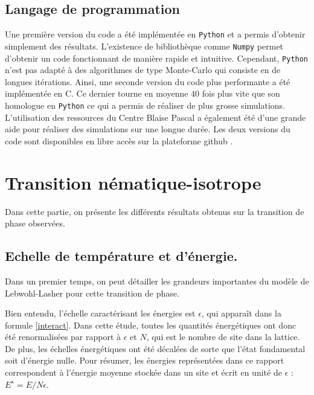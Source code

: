 \documentclass[11pt,a4paper]{article}
\numberwithin{equation}{section}
\newcommand{\CC}{C\nolinebreak\hspace{-.05em}\raisebox{.4ex}{\tiny\bf +}\nolinebreak\hspace{-.10em}\raisebox{.4ex}{\tiny\bf +}}
\def\CC{{C\nolinebreak[4]\hspace{-.05em}\raisebox{.4ex}{\tiny\bf ++}}}
\begin{document}
\subsection{Langage de programmation}
Une première version du code a été implémentée en \texttt{Python} et a permis d'obtenir simplement des résultats. L'existence de bibliothèque comme \texttt{Numpy} permet d'obtenir un code fonctionnant de manière rapide et intuitive. Cependant, \texttt{Python} n'est pas adapté à des algorithmes de type Monte-Carlo qui consiste en de longues itérations. Ainsi, une seconde version du code plus performante a été implémentée en \CC. Ce dernier tourne en moyenne 40 fois plus vite que son homologue en \texttt{Python} ce qui a permis de réaliser de plus grosse simulations. L'utilisation des ressources du Centre Blaise Pascal a également été d'une grande aide pour réaliser des simulations sur une longue durée. Les deux versions du code sont disponibles en libre accès sur la plateforme github \cite{github}.
\newpage
\section{Transition nématique-isotrope}
Dans cette partie, on présente les différents résultats obtenus sur la transition de phase observées. 
\subsection{Echelle de température et d'énergie.}
\label{scale}
Dans un premier temps, on peut détailler les grandeurs importantes du modèle de Lebwohl-Lasher pour cette transition de phase.
\medskip

Bien entendu, l'échelle caractérisant les énergies est $\epsilon$, qui apparaît dans la formule \ref{interact}. Dans cette étude, toutes les quantités énergétiques ont donc été renormalisées par rapport à $\epsilon$ et $N$, qui est le nombre de site dans la lattice. De plus, les échelles énergétiques ont été décalées de sorte que l'état fondamental soit d'énergie nulle. Pour résumer, les énergies représentées dans ce rapport correspondent à l'énergie moyenne stockée dans un site et écrit en unité de $\epsilon$ : $E^\star=E/N\epsilon$.
\medskip
\end{document}
